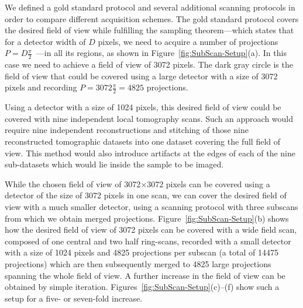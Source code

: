 We defined a gold standard protocol and several additional scanning protocols in order to compare different acquisition schemes. The gold standard protocol covers the desired field of view while fulfilling the sampling theorem---which states that for a detector width of $D$ pixels, we need to acquire a number of projections $P=D\frac{\pi}{2}$~\cite{Kak2002}---in all its regions, as shown in Figure~\ref{fig:SubScan-Setup}(a). In this case we need to achieve a field of view of 3072 pixels. The dark gray circle is the field of view that could be covered using a large detector with a size of 3072 pixels and recording $P=3072\frac{\pi}{2}=4825$ projections.

Using a detector with a size of 1024 pixels, this desired field of view could be covered with nine independent local tomography scans. Such an approach would require nine independent reconstructions and stitching of those nine reconstructed tomographic datasets into one dataset covering the full field of view. This method would also introduce artifacts at the edges of each of the nine sub-datasets which would lie inside the sample to be imaged.

While the chosen field of view of 3072$\times$3072 pixels can be covered using a detector of the size of 3072 pixels in one scan, we can cover the desired field of view with a much smaller detector, using a scanning protocol with three subscans from which we obtain merged projections. Figure~\ref{fig:SubScan-Setup}(b) shows how the desired field of view of 3072 pixels can be covered with a wide field scan, composed of one central and two half ring-scans, recorded with a small detector with a size of 1024 pixels and 4825 projections per subscan (a total of 14475 projections) which are then subsequently merged to 4825 large projections spanning the whole field of view. A further increase in the field of view can be obtained by simple iteration. Figures~\ref{fig:SubScan-Setup}(c)--(f) show such a setup for a five- or seven-fold increase.

